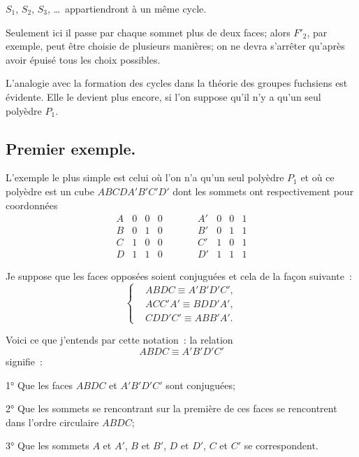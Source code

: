 \documentclass{article}
\begin{document}
$S_{1}$, $S_{2}$, $S_{3}$, \ldots\ appartiendront à un même cycle.

Seulement ici il passe par chaque sommet plus de deux faces; alors $F'_{2}$, par exemple, peut être choisie de plusieurs manières; on ne devra s'arrêter qu'après avoir épuisé tous les choix possibles.

L'analogie avec la formation des cycles dans la théorie des groupes fuchsiens est évidente. Elle le devient plus encore, si l'on suppose qu'il n'y a qu'un seul polyèdre $P_{1}$.

\subsection*{Premier exemple.}

L'exemple le plus simple est celui où l'on n'a qu'un seul polyèdre $P_{1}$ et où ce polyèdre est un cube $ABCDA'B'C'D'$ dont les sommets ont respectivement pour coordonnées
\[ \begin{matrix} A & 0 & 0 & 0 & \qquad & A' & 0 & 0 & 1 \\[1ex] B & 0 & 1 & 0 & \qquad & B' & 0 & 1 & 1 \\[1ex] C & 1 & 0 & 0 & \qquad & C' & 1 & 0 & 1 \\[1ex] D & 1 & 1 & 0 & \qquad & D' & 1 & 1 & 1 \end{matrix} \]

Je suppose que les faces opposées soient conjuguées et cela de la façon suivante~:
\[ \left\{ \begin{aligned} &ABDC \equiv A'B'D'C',\\ &ACC'A' \equiv BDD'A',\\ &CDD'C' \equiv ABB'A'. \end{aligned} \right. \tag{1} \]

Voici ce que j'entends par cette notation~: la relation
\[ ABDC \equiv A'B'D'C' \]
signifie~:

1° Que les faces $ABDC$ et $A'B'D'C'$ sont conjuguées;

2° Que les sommets se rencontrant sur la première de ces faces se rencontrent dans l'ordre circulaire $ABDC$;

3° Que les sommets $A$ et $A'$, $B$ et $B'$, $D$ et $D'$, $C$ et $C'$ se correspondent.
\end{document}
